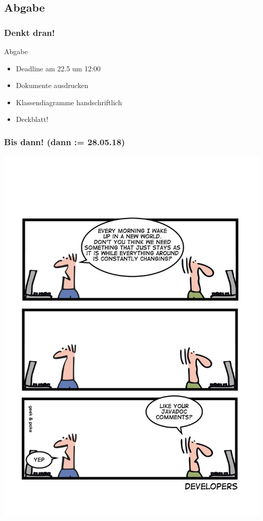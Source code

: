 \documentclass[18pt]{beamer}
\begin{document}
	\subsection{Abgabe}
	\begin{frame}
		\frametitle{Denkt dran!}
		\begin{alertblock}{Abgabe}
			\begin{itemize}
				\item Deadline am 22.5 um 12:00
				\item Dokumente ausdrucken
				\item Klassendiagramme handschriftlich
				\item Deckblatt!
			\end{itemize}
		\end{alertblock}
	\end{frame}
		
	\begin{frame}
		\frametitle{Bis dann! (dann := 28.05.18)}
		\centering
		\includegraphics[scale=0.86]{./comics/geek_and_poke_javadoc.jpg}
	\end{frame}
\end{document}
